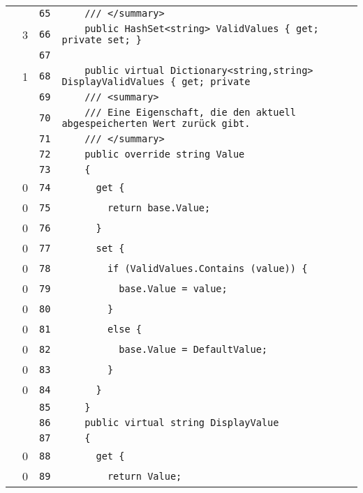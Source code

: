 \documentclass[a4paper,10pt]{article}
\begin{document}
\begin{longtable}[l]{lrrl}
\cellcolor{gray} &  & \verb~65~ & \verb~    /// </summary>~\\
\cellcolor{green} & 3 & \verb~66~ & \verb~    public HashSet<string> ValidValues { get; private set; }~\\
\cellcolor{gray} &  & \verb~67~ & \verb~~\\
\cellcolor{green} & 1 & \verb~68~ & \verb~    public virtual Dictionary<string,string> DisplayValidValues { get; private~\\
\cellcolor{gray} &  & \verb~69~ & \verb~    /// <summary>~\\
\cellcolor{gray} &  & \verb~70~ & \verb~    /// Eine Eigenschaft, die den aktuell abgespeicherten Wert zurück gibt.~\\
\cellcolor{gray} &  & \verb~71~ & \verb~    /// </summary>~\\
\cellcolor{gray} &  & \verb~72~ & \verb~    public override string Value~\\
\cellcolor{gray} &  & \verb~73~ & \verb~    {~\\
\cellcolor{red} & 0 & \verb~74~ & \verb~      get {~\\
\cellcolor{red} & 0 & \verb~75~ & \verb~        return base.Value;~\\
\cellcolor{red} & 0 & \verb~76~ & \verb~      }~\\
\cellcolor{red} & 0 & \verb~77~ & \verb~      set {~\\
\cellcolor{red} & 0 & \verb~78~ & \verb~        if (ValidValues.Contains (value)) {~\\
\cellcolor{red} & 0 & \verb~79~ & \verb~          base.Value = value;~\\
\cellcolor{red} & 0 & \verb~80~ & \verb~        }~\\
\cellcolor{red} & 0 & \verb~81~ & \verb~        else {~\\
\cellcolor{red} & 0 & \verb~82~ & \verb~          base.Value = DefaultValue;~\\
\cellcolor{red} & 0 & \verb~83~ & \verb~        }~\\
\cellcolor{red} & 0 & \verb~84~ & \verb~      }~\\
\cellcolor{gray} &  & \verb~85~ & \verb~    }~\\
\cellcolor{gray} &  & \verb~86~ & \verb~    public virtual string DisplayValue~\\
\cellcolor{gray} &  & \verb~87~ & \verb~    {~\\
\cellcolor{red} & 0 & \verb~88~ & \verb~      get {~\\
\cellcolor{red} & 0 & \verb~89~ & \verb~        return Value;~\\

\end{longtable}
\end{document}
